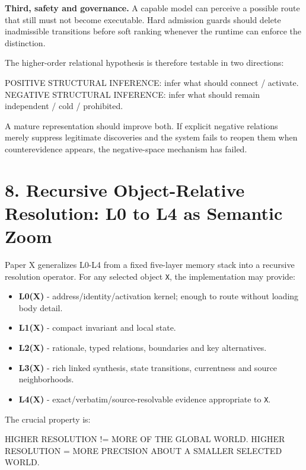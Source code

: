 \documentclass[
  10pt,
  letterpaper,
]{article}
\newenvironment{Shaded}{}{}
\newcommand{\NormalTok}[1]{#1}
\providecommand{\tightlist}{%
  \setlength{\itemsep}{0pt}\setlength{\parskip}{0pt}}
\begin{document}
\textbf{Third, safety and governance.} A capable model can perceive a
possible route that still must not become executable. Hard admission
guards should delete inadmissible transitions before soft ranking
whenever the runtime can enforce the distinction.

The higher-order relational hypothesis is therefore testable in two
directions:

\begin{Shaded}
\begin{Highlighting}[]
\NormalTok{POSITIVE STRUCTURAL INFERENCE: infer what should connect / activate.}
\NormalTok{NEGATIVE STRUCTURAL INFERENCE: infer what should remain independent / cold / prohibited.}
\end{Highlighting}
\end{Shaded}

A mature representation should improve both. If explicit negative
relations merely suppress legitimate discoveries and the system fails to
reopen them when counterevidence appears, the negative-space mechanism
has failed.

\section{8. Recursive Object-Relative Resolution: L0 to L4 as Semantic
Zoom}\label{8-recursive-object-relative-resolution-l0-to-l4-as-semantic-zoom}

Paper X generalizes L0-L4 from a fixed five-layer memory stack into a
recursive resolution operator. For any selected object \nolinkurl{X}, the
implementation may provide:

\begin{itemize}
\tightlist
\item
  \textbf{L0(X)} - address/identity/activation kernel; enough to route
  without loading body detail.
\item
  \textbf{L1(X)} - compact invariant and local state.
\item
  \textbf{L2(X)} - rationale, typed relations, boundaries and key
  alternatives.
\item
  \textbf{L3(X)} - rich linked synthesis, state transitions, currentness
  and source neighborhoods.
\item
  \textbf{L4(X)} - exact/verbatim/source-resolvable evidence appropriate
  to \nolinkurl{X}.
\end{itemize}

The crucial property is:

\begin{Shaded}
\begin{Highlighting}[]
\NormalTok{HIGHER RESOLUTION != MORE OF THE GLOBAL WORLD.}
\NormalTok{HIGHER RESOLUTION = MORE PRECISION ABOUT A SMALLER SELECTED WORLD.}
\end{Highlighting}
\end{Shaded}
\end{document}
